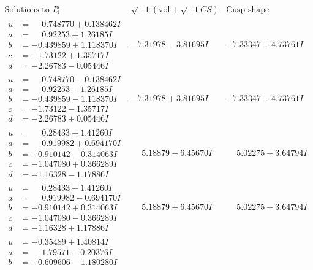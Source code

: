 \documentclass[1p]{elsarticle_modified}
\theoremstyle{definition}
\newcommand{\I}{\sqrt{-1}}
\begin{document}
$$\begin{array}{c|c|c}  
\text{Solutions to }I^u_{4}& \I (\text{vol} + \sqrt{-1}CS) & \text{Cusp shape}\\
 \hline 
\begin{aligned}
u &= \phantom{-}0.748770 + 0.138462 I \\
a &= \phantom{-}0.92253 + 1.26185 I \\
b &= -0.439859 + 1.118370 I \\
c &= -1.73122 + 1.35717 I \\
d &= -2.26783 - 0.05446 I\end{aligned}
 & -7.31978 - 3.81695 I & -7.33347 + 4.73761 I \\ \hline\begin{aligned}
u &= \phantom{-}0.748770 - 0.138462 I \\
a &= \phantom{-}0.92253 - 1.26185 I \\
b &= -0.439859 - 1.118370 I \\
c &= -1.73122 - 1.35717 I \\
d &= -2.26783 + 0.05446 I\end{aligned}
 & -7.31978 + 3.81695 I & -7.33347 - 4.73761 I \\ \hline\begin{aligned}
u &= \phantom{-}0.28433 + 1.41260 I \\
a &= \phantom{-}0.919982 + 0.694170 I \\
b &= -0.910142 - 0.314063 I \\
c &= -1.047080 + 0.366289 I \\
d &= -1.16328 - 1.17886 I\end{aligned}
 & \phantom{-}5.18879 - 6.45670 I & \phantom{-}5.02275 + 3.64794 I \\ \hline\begin{aligned}
u &= \phantom{-}0.28433 - 1.41260 I \\
a &= \phantom{-}0.919982 - 0.694170 I \\
b &= -0.910142 + 0.314063 I \\
c &= -1.047080 - 0.366289 I \\
d &= -1.16328 + 1.17886 I\end{aligned}
 & \phantom{-}5.18879 + 6.45670 I & \phantom{-}5.02275 - 3.64794 I \\ \hline\begin{aligned}
u &= -0.35489 + 1.40814 I \\
a &= \phantom{-}1.79571 - 0.20376 I \\
b &= -0.609606 - 1.180280 I \\

\end{aligned}
\end{array}$$
\end{document}
